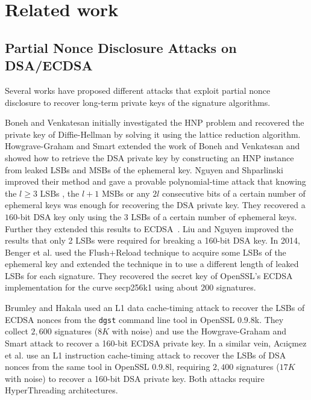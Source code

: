 \section{Related work}
\label{sec:relatedwork}
\subsection{Partial Nonce Disclosure Attacks on DSA/ECDSA}
Several works have proposed different attacks that exploit partial nonce disclosure to recover long-term private keys of the signature algorithms.


Boneh and Venkatesan \cite{boneh1996} initially investigated the HNP problem and recovered the private key of Diffie-Hellman by solving it using the lattice reduction algorithm.
Howgrave-Graham and Smart \cite{HG2001} extended the work of Boneh and Venkatesan \cite{boneh1996} and  showed how to retrieve the DSA private key by  constructing an HNP instance from leaked LSBs and MSBs of the ephemeral key.
Nguyen and Shparlinski \cite{Nguyen2002} improved their method  and gave a provable polynomial-time attack that
      knowing the $l \geq 3$ LSBs , the $l+1$ MSBs  or any $2l$ consecutive bits of a certain number of ephemeral keys was enough for recovering the DSA private key.
 They recovered  a $160$-bit DSA key only using the $3$ LSBs of a certain number of ephemeral keys.
 Further they extended this results to ECDSA~\cite{Nguyen2003}.
Liu and Nguyen \cite{Liu2013} improved the results that only 2 LSBs were required for breaking a 160-bit DSA key.
In 2014, Benger et al. \cite{Benger2014} used the Flush+Reload technique to acquire some LSBs of the ephemeral key
  and extended the technique in \cite{Nguyen2002} to use a different length of leaked LSBs for each signature.
 They recovered the secret key of OpenSSL's ECDSA implementation for the curve secp256k1 using about $200$ signatures.

Brumley and Hakala \cite{Brumley2009} used an L1 data cache-timing attack to recover the LSBs of ECDSA nonces from the \verb+dgst+ command line tool in OpenSSL 0.9.8k.
 They collect $2,600$ signatures ($8K$ with noise) and use the Howgrave-Graham and Smart \cite{HG2001} attack to recover a 160-bit ECDSA private key.
In a similar vein, Ac{\i}i{\c{c}}mez et al. \cite{Brumley2010} use an L1 instruction cache-timing attack to recover the LSBs of DSA nonces from the same tool in OpenSSL 0.9.8l, requiring $2,400$ signatures ($17K$ with noise) to recover a 160-bit DSA private key.
 Both attacks require HyperThreading architectures.

